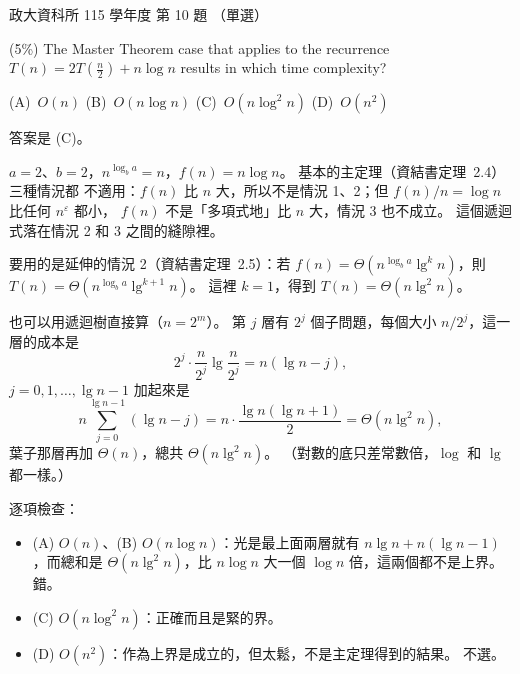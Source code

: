 \begin{pastexam}[label={px:nccu-115-dsa-10}]{政大資科所 115 學年度 第 10 題}
（單選）

(5\%) The Master Theorem case that applies to the recurrence $T(n)=2T\left(\frac{n}{2}\right)+n\log n$
results in which time complexity?

(A)~$O(n)$ \qquad (B)~$O(n\log n)$ \qquad (C)~$O(n\log^2 n)$ \qquad (D)~$O(n^2)$
\end{pastexam}

\begin{pastsoln}
答案是 (C)。

$a = 2$、$b = 2$，$n^{\log_b a} = n$，$f(n) = n\log n$。 基本的主定理（資結書定理~2.4）三種情況都
不適用：$f(n)$ 比 $n$ 大，所以不是情況 1、2；但 $f(n)/n = \log n$ 比任何 $n^{\varepsilon}$ 都小，
$f(n)$ 不是「多項式地」比 $n$ 大，情況 3 也不成立。 這個遞迴式落在情況 2 和 3 之間的縫隙裡。

要用的是延伸的情況 2（資結書定理~2.5）：若 $f(n) = \Theta(n^{\log_b a}\lg^k n)$，則
$T(n) = \Theta(n^{\log_b a}\lg^{k+1} n)$。 這裡 $k = 1$，得到 $T(n) = \Theta(n\lg^2 n)$。

也可以用遞迴樹直接算（$n = 2^m$）。 第 $j$ 層有 $2^j$ 個子問題，每個大小 $n/2^j$，這一層的成本是
\[
2^j \cdot \frac{n}{2^j}\lg\frac{n}{2^j} = n(\lg n - j),
\]
$j = 0, 1, \ldots, \lg n - 1$ 加起來是
\[
n\sum_{j=0}^{\lg n - 1}(\lg n - j) = n\cdot\frac{\lg n(\lg n + 1)}{2} = \Theta(n\lg^2 n),
\]
葉子那層再加 $\Theta(n)$，總共 $\Theta(n\lg^2 n)$。 （對數的底只差常數倍，$\log$ 和 $\lg$ 都一樣。）

逐項檢查：
\begin{itemize}
\item (A) $O(n)$、(B) $O(n\log n)$：光是最上面兩層就有 $n\lg n + n(\lg n - 1)$，而總和是
$\Theta(n\lg^2 n)$，比 $n\log n$ 大一個 $\log n$ 倍，這兩個都不是上界。 錯。
\item (C) $O(n\log^2 n)$：正確而且是緊的界。
\item (D) $O(n^2)$：作為上界是成立的，但太鬆，不是主定理得到的結果。 不選。
\end{itemize}
\end{pastsoln}
